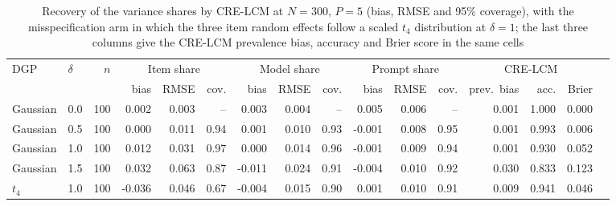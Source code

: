 \begin{table}[htbp]
\centering
\tiny
\setlength{\tabcolsep}{2.5pt}
\caption{Recovery of the variance shares by CRE-LCM at $N = 300$, $P = 5$ (bias, RMSE and 95\% coverage), with the misspecification arm in which the three item random effects follow a scaled $t_4$ distribution at $\delta = 1$; the last three columns give the CRE-LCM prevalence bias, accuracy and Brier score in the same cells}\label{tab:shares}
\begin{tabular}{llrrrrrrrrrrrrrr}
\toprule
DGP & $\delta$ & $n$ & \multicolumn{3}{c}{Item share} & \multicolumn{3}{c}{Model share} & \multicolumn{3}{c}{Prompt share} & \multicolumn{3}{c}{CRE-LCM} \\
\cmidrule(lr){4-6}\cmidrule(lr){7-9}\cmidrule(lr){10-12}\cmidrule(lr){13-15}
 & & & bias & RMSE & cov. & bias & RMSE & cov. & bias & RMSE & cov. & prev.\ bias & acc. & Brier \\
\midrule
Gaussian & 0.0 & 100 & 0.002 & 0.003 & -- & 0.003 & 0.004 & -- & 0.005 & 0.006 & -- & 0.001 & 1.000 & 0.000 \\
Gaussian & 0.5 & 100 & 0.000 & 0.011 & 0.94 & 0.001 & 0.010 & 0.93 & -0.001 & 0.008 & 0.95 & 0.001 & 0.993 & 0.006 \\
Gaussian & 1.0 & 100 & 0.012 & 0.031 & 0.97 & 0.000 & 0.014 & 0.96 & -0.001 & 0.009 & 0.94 & 0.001 & 0.930 & 0.052 \\
Gaussian & 1.5 & 100 & 0.032 & 0.063 & 0.87 & -0.011 & 0.024 & 0.91 & -0.004 & 0.010 & 0.92 & 0.030 & 0.833 & 0.123 \\
$t_4$ & 1.0 & 100 & -0.036 & 0.046 & 0.67 & -0.004 & 0.015 & 0.90 & 0.001 & 0.010 & 0.91 & 0.009 & 0.941 & 0.046 \\
\bottomrule
\end{tabular}
\end{table}
